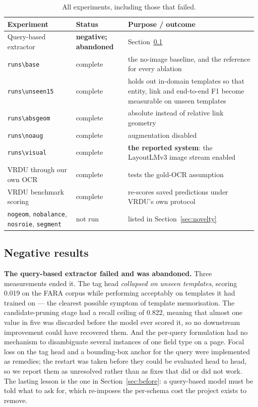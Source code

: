 \documentclass[11pt,a4paper]{article}
\newcommand{\code}[1]{\texttt{\small #1}}
\begin{document}
\begin{table}[!htb]
\centering\small
\begin{tabular}{@{}p{3.6cm}lp{7.0cm}@{}}
\toprule
\textbf{Experiment} & \textbf{Status} & \textbf{Purpose / outcome} \\
\midrule
Query-based extractor & \textbf{negative; abandoned} & Section~\ref{sec:negative} \\
\code{runs\textbackslash base} & complete & the no-image baseline, and the reference for every ablation \\
\code{runs\textbackslash unseen15} & complete & holds out in-domain templates so that entity,
link and end-to-end F1 become measurable on unseen templates \\
\code{runs\textbackslash absgeom} & complete & absolute instead of relative link geometry \\
\code{runs\textbackslash noaug} & complete & augmentation disabled \\
\code{runs\textbackslash visual} & complete & \textbf{the reported system}: the LayoutLMv3 image stream enabled \\
VRDU through our own OCR & complete & tests the gold-OCR assumption \\
VRDU benchmark scoring & complete & re-scores saved predictions under VRDU's own protocol \\
\code{nogeom}, \code{nobalance}, \code{nosroie}, \code{segment} & not run & listed in
Section~\ref{sec:novelty} \\
\bottomrule
\end{tabular}
\caption{All experiments, including those that failed.}
\label{tab:experiments}
\end{table}

\subsection{Negative results}
\label{sec:negative}

\textbf{The query-based extractor failed and was abandoned.} Three measurements ended it. The
tag head \emph{collapsed on unseen templates}, scoring 0.019 on the FARA corpus while performing
acceptably on templates it had trained on --- the clearest possible symptom of template
memorisation. The candidate-pruning stage had a recall ceiling of 0.822, meaning that almost one
value in five was discarded before the model ever scored it, so no downstream improvement could
have recovered them. And the per-query formulation had no mechanism to disambiguate several
instances of one field type on a page. Focal loss on the tag head and a bounding-box anchor for
the query were implemented as remedies; the restart was taken before they could be evaluated
head to head, so we report them as unresolved rather than as fixes that did or did not work.
The lasting lesson is the one in Section~\ref{sec:before}: a query-based model must be told what
to ask for, which re-imposes the per-schema cost the project exists to remove.
\end{document}
